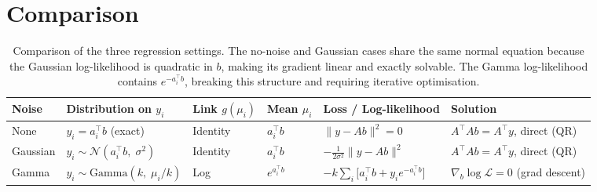 \documentclass{article}
\begin{document}
\section{Comparison}
\begin{table}[h]
\centering
\begin{tabular}{@{}llllll@{}}
\toprule
\textbf{Noise} & \textbf{Distribution on } $y_i$ & \textbf{Link} $g(\mu_i)$ & \textbf{Mean} $\mu_i$ & \textbf{Loss / Log-likelihood} & \textbf{Solution} \\
\midrule
None
  & $y_i = a_i^\top b$ (exact)
  & Identity
  & $a_i^\top b$
  & $\|y - Ab\|^2 = 0$
  & $A^\top A b = A^\top y$, direct (QR) \\[4pt]
Gaussian
  & $y_i \sim \mathcal{N}(a_i^\top b,\;\sigma^2)$
  & Identity
  & $a_i^\top b$
  & $-\tfrac{1}{2\sigma^2}\|y-Ab\|^2$\;
  & $A^\top A b = A^\top y$, direct (QR) \\[4pt]
Gamma
  & $y_i \sim \mathrm{Gamma}(k,\;\mu_i/k)$
  & Log
  & $e^{a_i^\top b}$
  & $-k\sum_i\bigl[a_i^\top b + y_i e^{-a_i^\top b}\bigr]$\;
  & $\nabla_b \log\mathcal{L}=0$ (grad descent) \\
\bottomrule
\end{tabular}
\caption{Comparison of the three regression settings. The no-noise and Gaussian cases share the same normal equation because the Gaussian log-likelihood is quadratic in $b$, making its gradient linear and exactly solvable. The Gamma log-likelihood contains $e^{-a_i^\top b}$, breaking this structure and requiring iterative optimisation.}
\end{table}
\end{document}
